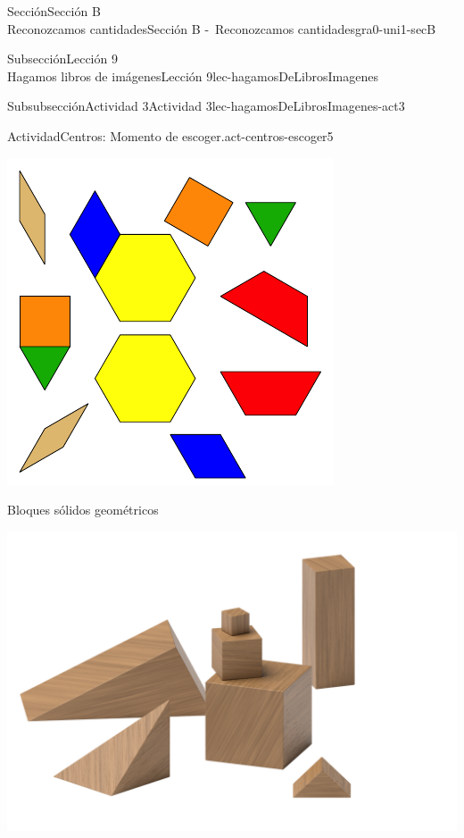 \begin{sectionptx}{Sección}{{\Large Sección B\\}Reconozcamos cantidades}{}{Sección B -~Reconozcamos cantidades}{}{}{gra0-uni1-secB}
\begin{subsectionptx}{Subsección}{{\normalsize Lección 9\\[-0.05cm]}Hagamos libros de imágenes}{}{Lección 9}{}{}{lec-hagamosDeLibrosImagenes}
\begin{subsubsectionptx}{Subsubsección}{Actividad 3}{}{Actividad 3}{}{}{lec-hagamosDeLibrosImagenes-act3}
\begin{activity}{Actividad}{Centros: Momento de escoger.}{act-centros-escoger5}
\begin{sidebyside}{2}{0.025}{0.025}{0.05}
\begin{sbspanel}{0.45}
\includegraphics[max width=\linewidth, center]{external/svg-source/tikz-file-147344.pdf}
\end{sbspanel}%
\end{sidebyside}%
\vspace*{1ex minus 0.8ex}
\begin{sidebyside}{2}{0.025}{0.025}{0.05}%
\begin{sbspanel}{0.45}%
Bloques sólidos geométricos%
\par
\includegraphics[max width=\linewidth, center]{external/png-source/K.1.A Beta Student Workbook.Geoblocks.png}

\end{sbspanel}
\end{sidebyside}
\end{activity}
\end{subsubsectionptx}
\end{subsectionptx}
\end{sectionptx}
